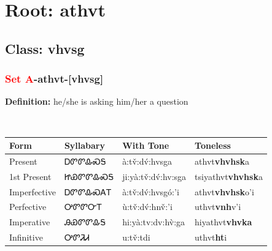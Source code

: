 \needspace{4in}
\section*{Root: athvt}
\nopagebreak
{}
\needspace{3in}
\subsection*{Class: vhvsg}
\nopagebreak
\needspace{2in}
\subsubsection*{\textcolor{Red}{Set A}{-}\textbf{athvt}{-}[vhvsg]}
\nopagebreak
\textbf{Definition: } he/she is asking him/her a question
\\[0.5em]
\begin{tabularx}{\textwidth}{l X X X}%
\toprule%
\textbf{Form}&\textbf{Syllabary}&\textbf{With Tone}&\textbf{Toneless}\\%
\midrule%
Present&ᎠᏛᏛᎲᏍᎦ&à:tv̌:dv́:hvsga&athvt\textbf{vhvhsk}a\\%
1st Present&ᏥᏯᏛᏛᎲᏍᎦ&ji:yà:tv̌:dv́:hv:sga&tsiyathvt\textbf{vhvhsk}a\\%
Imperfective&ᎠᏛᏛᎲᏍᎪᎢ&à:tv̌:dv́:hvsgó:’i&athvt\textbf{vhvhsk}o'i\\%
Perfective&ᎤᏛᏛᏅᎢ&ù:tv̌:dv́:hnv̌:’i&uthvt\textbf{vnh}v'i\\%
Imperative&ᎯᏯᏛᏛᎲᎦ&hi:yà:tv:dv:hv̀:ga&hiyathvt\textbf{vhvka}\\%
Infinitive&ᎤᏛᏘᏗ&u:tv̌:tdi&uthvt\textbf{ht}i\\%
\bottomrule%
\end{tabularx}
\\[1em]